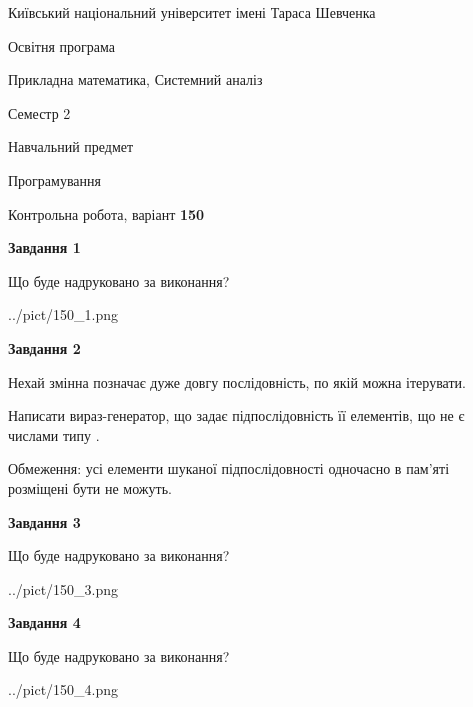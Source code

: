 \documentclass[12pt, ukrainian]{article}
\begin{document}
{{\begin {small}\par
{ \center  Київський національний університет імені Тараса Шевченка \par}
{\parbox {5 cm}{Освітня програма \hfill}{\parbox {8 cm}{Прикладна математика, Системний аналіз \hfill}}\parbox {5 cm}{\hfill Семестр 2}}\par
{\parbox {5 cm} {Навчальний предмет \hfill}\parbox {7 cm}{Програмування \hfill}\parbox {6cm}{\hfill}\par}\vspace{-7pt} \end{small}}{\center Контрольна робота, варіант  \No \textbf
{ 150 }\par}}
{
\begin {large}
{\begin {center}\textbf{Завдання 1}\end {center}}\par
Що буде надруковано за виконання?\par\par
\begin{center}
	{../pict/150_1.png}
\end{center}
\newpage

{\begin {center}\textbf{Завдання 2}\end {center}}\par
Нехай змінна  позначає дуже довгу послідовність, по якій можна ітерувати.

Написати вираз-генератор, що задає підпослідовність її елементів, що не є числами типу .

Обмеження: усі елементи шуканої підпослідовності одночасно в пам'яті розміщені бути не можуть.\par
\newpage

{\begin {center}\textbf{Завдання 3}\end {center}}\par
Що буде надруковано за виконання?\par
\begin{center}
	{../pict/150_3.png}
\end{center}
\newpage

{\begin {center}\textbf{Завдання 4}\end {center}}\par
Що буде надруковано за виконання?\par
\begin{center}
	{../pict/150_4.png}
\end{center}
\newpage


\end{large}}
\end{document}
